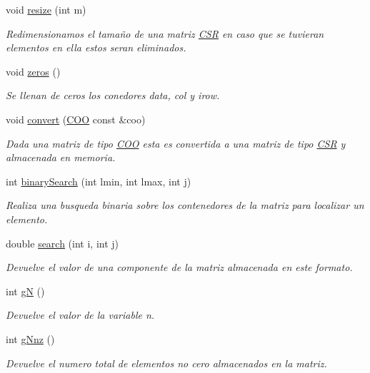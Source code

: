 \begin{DoxyCompactItemize}
void \hyperlink{class_c_s_r_ad89020cc1d7d9fcda50e2b241e928c5b}{resize} (int m)
\begin{DoxyCompactList}\small\item\em Redimensionamos el tamaño de una matriz \hyperlink{class_c_s_r}{C\+SR} en caso que se tuvieran elementos en ella estos seran eliminados. \end{DoxyCompactList}\item 
void \hyperlink{class_c_s_r_aeee0524514c9365bd324676e769cb869}{zeros} ()
\begin{DoxyCompactList}\small\item\em Se llenan de ceros los conedores data, col y irow. \end{DoxyCompactList}\item 
void \hyperlink{class_c_s_r_aa8e97652354b0c384cc420ed5f50f353}{convert} (\hyperlink{class_c_o_o}{C\+OO} const \&coo)
\begin{DoxyCompactList}\small\item\em Dada una matriz de tipo \hyperlink{class_c_o_o}{C\+OO} esta es convertida a una matriz de tipo \hyperlink{class_c_s_r}{C\+SR} y almacenada en memoria. \end{DoxyCompactList}\item 
int \hyperlink{class_c_s_r_a3aea9588569f106af8d753ac16ed3215}{binary\+Search} (int lmin, int lmax, int j)
\begin{DoxyCompactList}\small\item\em Realiza una busqueda binaria sobre los contenedores de la matriz para localizar un elemento. \end{DoxyCompactList}\item 
double \hyperlink{class_c_s_r_afd302aaea45e8bb0acbd4fea15aa39be}{search} (int i, int j)
\begin{DoxyCompactList}\small\item\em Devuelve el valor de una componente de la matriz almacenada en este formato. \end{DoxyCompactList}\item 
int \hyperlink{class_c_s_r_aa32f7bdefbbc779fdc8752b4059cd277}{gN} ()
\begin{DoxyCompactList}\small\item\em Devuelve el valor de la variable n. \end{DoxyCompactList}\item 
int \hyperlink{class_c_s_r_a0c25f2e1649edb38387ca56e39874cc9}{g\+Nnz} ()
\begin{DoxyCompactList}\small\item\em Devuelve el numero total de elementos no cero almacenados en la matriz. \end{DoxyCompactList}\item 

\end{DoxyCompactItemize}
